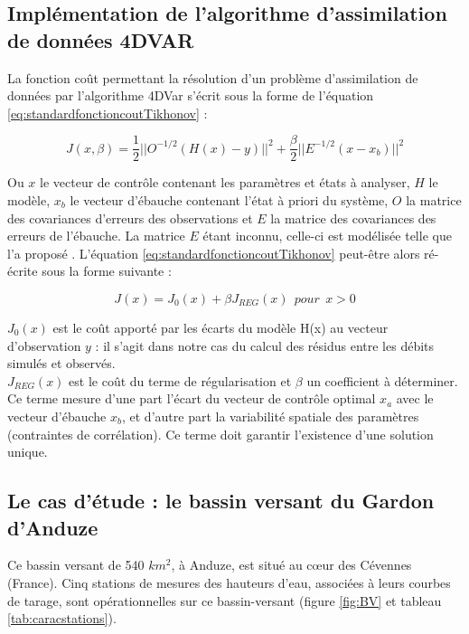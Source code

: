 \documentclass[a4paper,11pt]{article}
\begin{document}
\subsection{Implémentation de l'algorithme d'assimilation de données 4DVAR}

La fonction coût permettant la résolution d'un problème d'assimilation de données par l'algorithme 4DVar s’écrit sous la forme de l'équation \ref{eq:standardfonctioncoutTikhonov} \citep{gejadze2016discharge} :

\begin{equation}\label{eq:standardfonctioncoutTikhonov}
 J(x,\beta)=\frac{1}{2}||O^{-1/2} (H(x)-y) ||^2 + \frac{\beta}{2}||E^{-1/2}(x-x_b)||^2
\end{equation}

Ou $x$ le vecteur de contrôle contenant les paramètres et états à analyser, $H$ le modèle, $x_b$ le vecteur d'ébauche contenant l'état à priori du système, $O$ la matrice des covariances d'erreurs des observations et $E$ la matrice des covariances des erreurs de l'ébauche. La matrice $E$ étant inconnu, celle-ci est modélisée telle que l'a proposé \citep{gejadze2016discharge}. L'équation \ref{eq:standardfonctioncoutTikhonov} peut-être alors ré-écrite sous la forme suivante :

\begin{equation}\label{eq:fctcoutgrdc}
  J(x)=J_0(x)+ \beta J_{REG}(x)\ \ pour\ \ x>0
\end{equation}

$J_0(x)$ est le coût apporté par les écarts du modèle H(x) au vecteur d'observation $y$ : il s'agit dans notre cas du calcul des résidus entre les débits simulés et observés.\\
$J_{REG}(x)$ est le coût du terme de régularisation et $\beta$ un coefficient à déterminer. Ce terme mesure d'une part l'écart du vecteur de contrôle optimal $x_a$ avec le vecteur d'ébauche $x_b$, et d'autre part la variabilité spatiale des paramètres (contraintes de corrélation). Ce terme doit garantir l'existence d'une solution unique.\\


\subsection{Le cas d'étude : le bassin versant du Gardon d'Anduze}

Ce bassin versant de 540 $km^2$, à Anduze, est situé au cœur des Cévennes (France). Cinq stations de mesures des hauteurs d'eau, associées à leurs courbes de tarage, sont opérationnelles sur ce bassin-versant (figure \ref{fig:BV} et tableau \ref{tab:caracstations}). 
\end{document}
